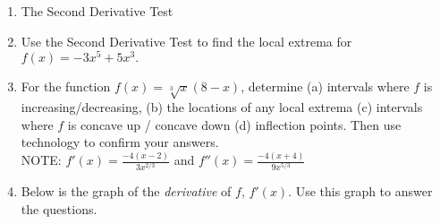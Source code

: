 \documentclass[11pt,fleqn]{article}
\begin{document}
\setlength{\parindent}{0cm}
\renewcommand{\headrulewidth}{0pt}
\newcommand{\blank}[1]{\rule{#1}{0.75pt}}
\renewcommand{\d}{\displaystyle}
\vspace*{-0.7in}
\begin{center}
 {\large{ }}
\end{center}
 \begin{enumerate}
 \item The Second Derivative Test
 \vspace{2in}
\item Use the Second Derivative Test to find the local extrema for $f(x)=-3x^5+5x^3.$
\vspace{1in}
 \item For the function $f(x)=\sqrt[3]{x}(8-x)$, determine (a) intervals where $f$ is increasing/decreasing, (b) the locations of any local extrema (c) intervals where $f$ is concave up / concave down (d) inflection points. Then use technology to confirm your answers. \\NOTE: $f'(x)=\displaystyle{\frac{-4(x-2)}{3x^{2/3}}}$ and $f''(x)=\displaystyle{\frac{-4(x+4)}{9x^{5/3}}}$
 \newpage
 \item  Below is the graph of the \emph{derivative} of $f$, \large{$f'(x)$}. Use this graph to answer the questions.
 
 \begin{multicols}{2}
\quad

\vspace{.3in}
\quad

\columnbreak


\end{multicols}
\end{enumerate}
\end{document}
